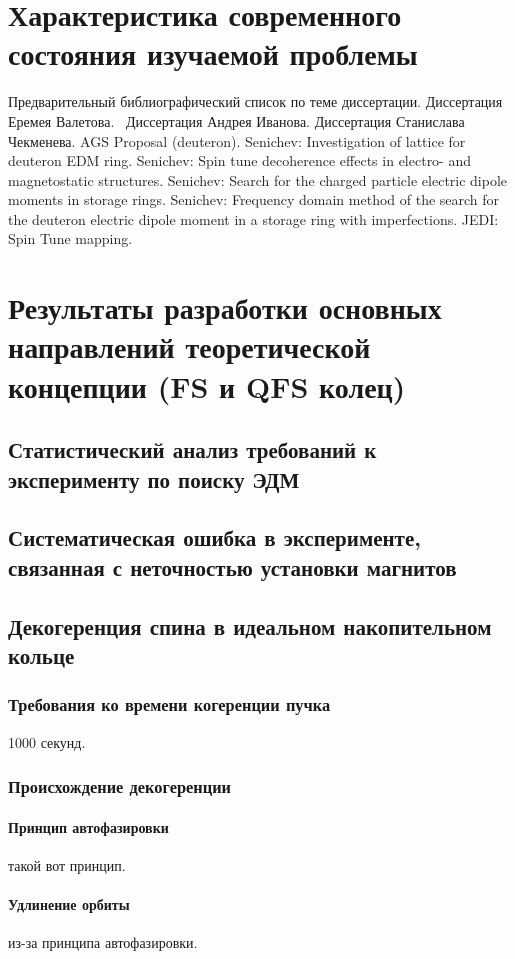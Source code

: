 \documentclass{report}
\begin{document}
\chapter{Характеристика современного состояния изучаемой проблемы}
Предварительный библиографический список по теме диссертации.
Диссертация Еремея Валетова.~\citep[p.~235]{Eremey:Thesis}
Диссертация Андрея Иванова.
Диссертация Станислава Чекменева.
AGS Proposal (deuteron).
Senichev: Investigation of lattice for deuteron EDM ring.
Senichev: Spin tune decoherence effects in electro- and magnetostatic structures.
Senichev: Search for the charged particle electric dipole moments in storage rings.
Senichev: Frequency domain method of the search for the deuteron electric dipole moment in a storage ring with imperfections.
JEDI: Spin Tune mapping.


\chapter{Результаты разработки основных направлений теоретической концепции (FS и QFS колец)}
\section{Статистический анализ требований к эксперименту по поиску ЭДМ}

\section{Систематическая ошибка в эксперименте, связанная с неточностью установки магнитов}

\section{Декогеренция спина в идеальном накопительном кольце}
\subsection{Требования ко времени когеренции пучка}
1000 секунд.
\subsection{Происхождение декогеренции}
\subsubsection{Принцип автофазировки}
такой вот принцип.
\subsubsection{Удлинение орбиты}
из-за принципа автофазировки.
\end{document}
